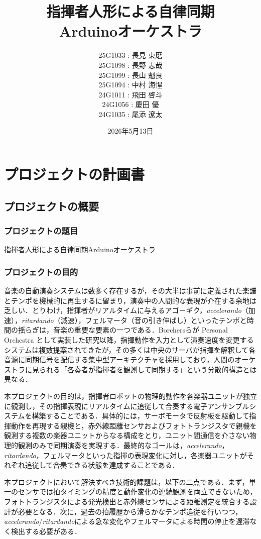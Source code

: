 \documentclass[lualatex,book,paper=a4paper,jafontsize=11.5pt,jafontscale=1.05,oneside]{jlreq}
\title{指揮者人形による自律同期\\Arduinoオーケストラ}
\author{
  25G1033 : 長見 東磨\\
  25G1098 : 長野 志哉\\
  25G1099 : 長山 魁良\\
  25G1094 : 中村 海惺\\
  24G1011 : 飛田 啓斗\\
  24G1056 : 慶田 優\phantom{磨}\\
  24G1035 : 尾添 遼太
}
\date{2026年5月13日}
\begin{document}
\maketitle


\chapter{プロジェクトの計画書}\label{chap:project-plan}\setcounter{page}{1}

\section{プロジェクトの概要}

\subsection{プロジェクトの題目}
指揮者人形による自律同期Arduinoオーケストラ

\subsection{プロジェクトの目的}

音楽の自動演奏システムは数多く存在するが，その大半は事前に定義された楽譜とテンポを機械的に再生するに留まり，演奏中の人間的な表現が介在する余地は乏しい．とりわけ，指揮者がリアルタイムに与えるアゴーギク，\textit{accelerando}（加速），\textit{ritardando}（減速），フェルマータ（音の引き伸ばし）といったテンポと時間の揺らぎは，音楽の重要な要素の一つである．Borchersらが Personal Orchestra として実装した研究\cite{borchers2004personal}以降，指揮動作を入力として演奏速度を変更するシステムは複数提案されてきたが，その多くは中央のサーバが指揮を解釈して各音源に同期信号を配信する集中型アーキテクチャを採用しており，人間のオーケストラに見られる「各奏者が指揮者を観測して同期する」という分散的構造とは異なる．

本プロジェクトの目的は，指揮者ロボットの物理的動作を各楽器ユニットが独立に観測し，その指揮表現にリアルタイムに追従して合奏する電子アンサンブルシステムを構築することである．具体的には，サーボモータで反射板を駆動して指揮動作を再現する親機と，赤外線距離センサおよびフォトトランジスタで親機を観測する複数の楽器ユニットからなる構成をとり，ユニット間通信を介さない物理的観測のみで同期演奏を実現する．最終的なゴールは，\textit{accelerando}，\textit{ritardando}，フェルマータといった指揮の表現変化に対し，各楽器ユニットがそれぞれ追従して合奏できる状態を達成することである．

本プロジェクトにおいて解決すべき技術的課題は，以下の二点である．まず，単一のセンサでは拍タイミングの精度と動作変化の連続観測を両立できないため，フォトトランジスタによる発光検出と赤外線センサによる距離測定を統合する設計が必要となる．次に，過去の拍履歴から滑らかなテンポ追従を行いつつ，\textit{accelerando}/\textit{ritardando}による急な変化やフェルマータによる時間の停止を遅滞なく検出する必要がある．
\end{document}
